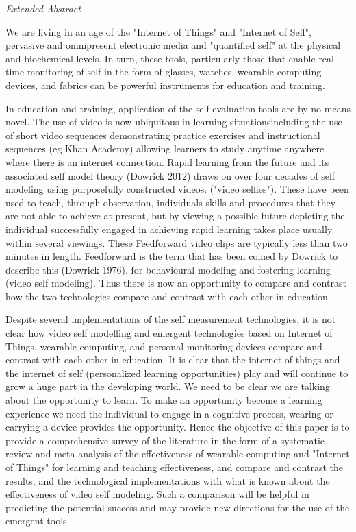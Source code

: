 \textit{Extended Abstract} 

We are living in an age of the "Internet of Things" and "Internet of Self", pervasive and omnipresent electronic media and "quantified self" at the physical and biochemical levels. In turn, these tools, particularly those that enable real time monitoring of self in the form of glasses, watches, wearable computing devices, and fabrics can be powerful instruments for education and training. 

In education and training, application of the self evaluation tools are by no means novel. The use of video is now ubiquitous in learning situationsincluding the use of short video sequences demonstrating practice exercises and instructional sequences (eg Khan Academy) allowing learners to study anytime anywhere where there is an internet connection.  Rapid learning from the future and its associated self model theory (Dowrick 2012) draws on over four decades of  self modeling using purposefully constructed videos. ("video selfies"). These have been used to teach, through observation, individuals skills and procedures that they are not able to achieve at present, but by viewing a possible future depicting the individual successfully engaged in achieving rapid learning takes place usually within several viewings. These Feedforward video clips are typically less than two minutes in length. Feedforward is the term that has been coined by Dowrick to describe this (Dowrick 1976). for behavioural modeling and fostering learning (video self modeling). Thus there is now an opportunity to compare and contrast how the two technologies compare and contrast with each other in education. 

Despite several implementations of the self measurement technologies, it is not clear how video self modelling and emergent technologies based on Internet of Things, wearable computing, and personal monitoring devices compare and contrast with each other in education. It is clear that the internet of things and the internet of self (personalized learning opportunities) play and will continue to grow a huge part in the developing world.  We need to be clear we are talking about the opportunity to learn. To make an opportunity become a learning experience we need the individual to engage in a cognitive process, wearing or carrying a device provides the opportunity.   Hence the objective of this paper is to provide a comprehensive survey of the literature in the form of a systematic review and meta analysis of the effectiveness of wearable computing and "Internet of Things" for learning and teaching effectiveness, and compare and contrast the results, and the technological implementations with what is known about the effectiveness of video self modeling. Such a comparison will be helpful in predicting the potential success and may provide new directions for the use of the emergent tools.


